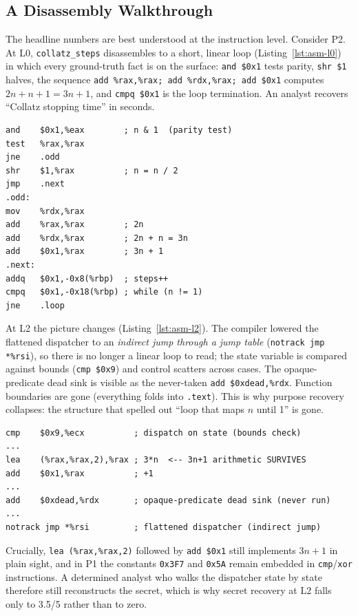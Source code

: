 \documentclass[conference]{IEEEtran}
\begin{document}
\subsection{A Disassembly Walkthrough}
The headline numbers are best understood at the instruction level. Consider P2.
At L0, \texttt{collatz\_steps} disassembles to a short, linear loop
(Listing~\ref{lst:asm-l0}) in which every ground-truth fact is on the surface:
\texttt{and \$0x1} tests parity, \texttt{shr \$1} halves, the sequence
\texttt{add \%rax,\%rax; add \%rdx,\%rax; add \$0x1} computes $2n+n+1=3n+1$, and
\texttt{cmpq \$0x1} is the loop termination. An analyst recovers ``Collatz
stopping time'' in seconds.

\begin{lstlisting}[style=asm,caption={P2 at L0: the Collatz loop is explicit.},label={lst:asm-l0}]
and    $0x1,%eax        ; n & 1  (parity test)
test   %rax,%rax
jne    .odd
shr    $1,%rax          ; n = n / 2
jmp    .next
.odd:
mov    %rdx,%rax
add    %rax,%rax        ; 2n
add    %rdx,%rax        ; 2n + n = 3n
add    $0x1,%rax        ; 3n + 1
.next:
addq   $0x1,-0x8(%rbp)  ; steps++
cmpq   $0x1,-0x18(%rbp) ; while (n != 1)
jne    .loop
\end{lstlisting}

At L2 the picture changes (Listing~\ref{lst:asm-l2}). The compiler lowered the
flattened dispatcher to an \emph{indirect jump through a jump table}
(\texttt{notrack jmp *\%rsi}), so there is no longer a linear loop to read; the
state variable is compared against bounds (\texttt{cmp \$0x9}) and control scatters
across cases. The opaque-predicate dead sink is visible as the never-taken
\texttt{add \$0xdead,\%rdx}. Function boundaries are gone (everything folds into
\texttt{.text}). This is why purpose recovery collapses: the structure that
spelled out ``loop that maps $n$ until 1'' is gone.

\begin{lstlisting}[style=asm,caption={P2 at L2: flattening becomes an indirect jump table, but the arithmetic survives.},label={lst:asm-l2}]
cmp    $0x9,%ecx          ; dispatch on state (bounds check)
...
lea    (%rax,%rax,2),%rax ; 3*n  <-- 3n+1 arithmetic SURVIVES
add    $0x1,%rax          ; +1
...
add    $0xdead,%rdx       ; opaque-predicate dead sink (never run)
...
notrack jmp *%rsi         ; flattened dispatcher (indirect jump)
\end{lstlisting}

Crucially, \texttt{lea (\%rax,\%rax,2)} followed by \texttt{add \$0x1} still
implements $3n+1$ in plain sight, and in P1 the constants \texttt{0x3F7} and
\texttt{0x5A} remain embedded in \texttt{cmp}/\texttt{xor} instructions. A
determined analyst who walks the dispatcher state by state therefore still
reconstructs the secret, which is why secret recovery at L2 falls only to 3.5/5
rather than to zero.
\end{document}
